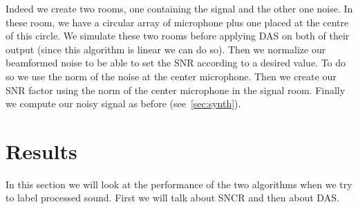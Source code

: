 \documentclass[11pt,a4paper,titlepage]{report}
\begin{document}
Indeed we create two rooms, one containing the signal and the other one noise. In these room, we have a circular array of microphone plus one placed at the centre of this circle. We simulate these two rooms before applying DAS on both of their output (since this algorithm is linear we can do so). Then we normalize our beamformed noise to be able to set the SNR according to a desired value. To do so we use the norm of the noise at the center microphone. Then we create our SNR factor using the norm of the center microphone in the signal room. Finally we compute our noisy signal as before (see~\ref{sec:synth}).


\chapter{Results}
\hspace*{0.6cm}
In this section we will look at the performance of the two algorithms when we try to label processed sound. First we will talk about SNCR and then about DAS.
\end{document}
